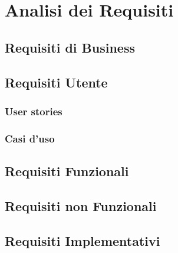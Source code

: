 \chapter{Analisi dei Requisiti}
	\section{Requisiti di Business}
	
	\section{Requisiti Utente}
        \subsection{User stories}
	    \subsection{Casi d'uso}
	\section{Requisiti Funzionali}
	\section{Requisiti non Funzionali}
	\section{Requisiti Implementativi}
